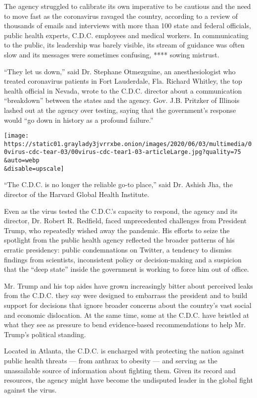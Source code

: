 The agency struggled to calibrate its own imperative to be cautious and
the need to move fast as the coronavirus ravaged the country, according
to a review of thousands of emails and interviews with more than 100
state and federal officials, public health experts, C.D.C. employees and
medical workers. In communicating to the public, its leadership was
barely visible, its stream of guidance was often slow and its messages
were sometimes confusing, **** sowing mistrust.

``They let us down,'' said Dr. Stephane Otmezguine, an anesthesiologist
who treated coronavirus patients in Fort Lauderdale, Fla. Richard
Whitley, the top health official in Nevada, wrote to the C.D.C. director
about a communication ``breakdown'' between the states and the agency.
Gov. J.B. Pritzker of Illinois lashed out at the agency over testing,
saying that the government's response would ``go down in history as a
profound failure.''

\texttt{[image: https://static01.graylady3jvrrxbe.onion/images/2020/06/03/multimedia/00virus-cdc-tear-03/00virus-cdc-tear1-03-articleLarge.jpg?quality=75\\\&auto=webp\\\&disable=upscale]}

``The C.D.C. is no longer the reliable go-to place,'' said Dr. Ashish
Jha, the director of the Harvard Global Health Institute.

Even as the virus tested the C.D.C.'s capacity to respond, the agency
and its director, Dr. Robert R. Redfield, faced unprecedented challenges
from President Trump, who repeatedly wished away the pandemic. His
efforts to seize the spotlight from the public health agency reflected
the broader patterns of his erratic presidency: public condemnations on
Twitter, a tendency to dismiss findings from scientists, inconsistent
policy or decision-making and a suspicion that the ``deep state'' inside
the government is working to force him out of office.

Mr. Trump and his top aides have grown increasingly bitter about
perceived leaks from the C.D.C. they say were designed to embarrass the
president and to build support for decisions that ignore broader
concerns about the country's vast social and economic dislocation. At
the same time, some at the C.D.C. have bristled at what they see as
pressure to bend evidence-based recommendations to help Mr. Trump's
political standing.

Located in Atlanta, the C.D.C. is encharged with protecting the nation
against public health threats --- from anthrax to obesity --- and
serving as the unassailable source of information about fighting them.
Given its record and resources, the agency might have become the
undisputed leader in the global fight against the virus.

